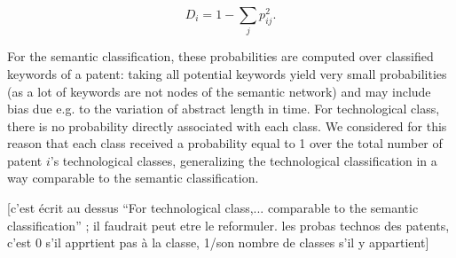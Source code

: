\documentclass[10pt,A4]{article}
\begin{document}
\[
D_i = 1 - \sum_j {p_{ij}^2}.
\]

For the semantic classification, these probabilities are computed over classified keywords of a patent: taking all potential keywords yield very small probabilities (as a lot of keywords are not nodes of the semantic network) and may include bias due e.g. to the variation of abstract length in time. For technological class, there is no probability directly associated with each class. We considered for this reason that each class received a probability equal to 1 over the total number of patent $i$'s technological classes, generalizing the technological classification in a way comparable to the semantic classification. 

[c'est écrit au dessus ``For technological class,... comparable to the semantic classification'' ; il faudrait peut etre le reformuler. les probas technos des patents, c'est 0 s'il apprtient pas à la classe, 1/son nombre de classes s'il y appartient]
\end{document}

